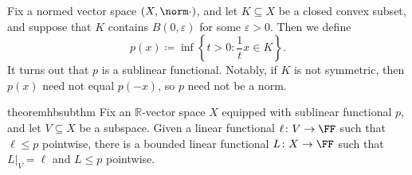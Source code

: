 \documentclass[../notes.tex]{subfiles}
\begin{document}
\begin{example}
	Fix a normed vector space $(X,\norm\cdot)$, and let $K\subseteq X$ be a closed convex subset, and suppose that $K$ contains $B(0,\varepsilon)$ for some $\varepsilon>0$. Then we define
	\[p(x)\coloneqq\inf\left\{t>0:\frac1tx\in K\right\}.\]
	It turns out that $p$ is a sublinear functional. Notably, if $K$ is not symmetric, then $p(x)$ need not equal $p(-x)$, so $p$ need not be a norm.
\end{example}
\begin{restatable}{theorem}{hbsubthm} \label{thm:hb-sub}
	Fix an $\mathbb R$-vector space $X$ equipped with sublinear functional $p$, and let $V\subseteq X$ be a subspace. Given a linear functional $\ell\colon V\to\FF$ such that $\ell\le p$ pointwise, there is a bounded linear functional $L\colon X\to\FF$ such that $L|_V=\ell$ and $L\le p$ pointwise.
\end{restatable}
\end{document}
